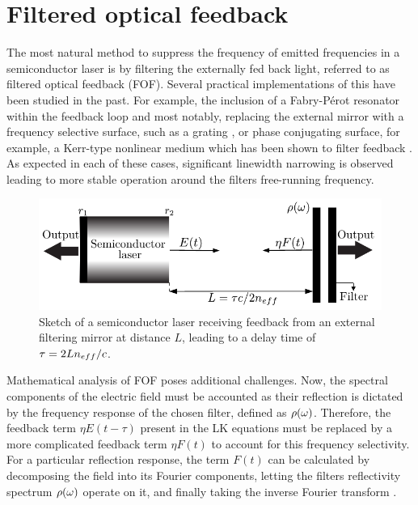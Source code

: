 \section*{Filtered optical feedback}
\label{sec:FOF}
%
The most natural method to suppress the frequency of emitted frequencies in a semiconductor laser is by filtering the externally fed back light, referred to as filtered optical feedback (FOF). Several practical implementations of this have been studied in the past. For example, the inclusion of a Fabry-P\'erot resonator within the feedback loop \cite{detienne1997semiconductor} and most notably, replacing the external mirror with a frequency selective surface, such as a grating \cite{dahmani1987frequency, harvey1991external, jin1996single}, or phase conjugating surface, for example, a Kerr-type nonlinear medium which has been shown to filter feedback \cite{agrawal1984line}. As expected in each of these cases, significant linewidth narrowing is observed leading to more stable operation around the filters free-running frequency. 
%
\begin{figure}
    \centering
    
    \includegraphics[width=0.7\linewidth]{Images/Introduction/FOF_setup.pdf}
    
    \caption{Sketch of a semiconductor laser receiving feedback from an external filtering mirror at distance $L$, leading to a delay time of $\tau=2 L n_{eff}/c$.}
    
    \label{fig:FOF}
\end{figure}
%
\par
%
Mathematical analysis of FOF poses additional challenges. Now, the spectral components of the electric field must be accounted as their reflection is dictated by the frequency response of the chosen filter, defined as $\rho(\omega)$. Therefore, the feedback term $\eta E(t-\tau)$ present in the LK equations must be replaced by a more complicated feedback term $\eta F(t)$ to account for this frequency selectivity. For a particular reflection response, the term $F(t)$ can be calculated by decomposing the field into its Fourier components, letting the filters reflectivity spectrum $\rho(\omega)$ operate on it, and finally taking the inverse Fourier transform \cite{yousefi1999dynamical}.
